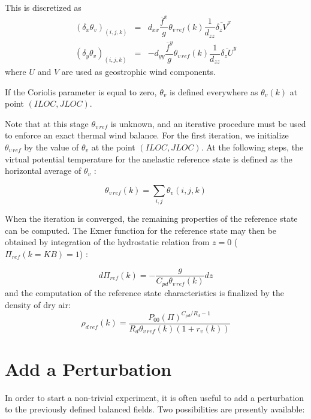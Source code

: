 This is discretized as
\begin{eqnarray}
\left( \delta _{x} \theta_{v}\right)_{(i,j,k)} & = & d_{xx}
 \dfrac{\overline{f}^x}{g}
\theta_{v\,ref}(k) \dfrac{1}{d_{zz}} \overline{\delta_{z} V}^x  \\
\left( \delta _{y} \theta_{v}\right)_{(i,j,k)} & = & - d_{yy}
 \dfrac{\overline{f}^y}{g}
\theta_{v\,ref}(k) \dfrac{1}{d_{zz}} \overline{\delta_{z} U }^y
\end{eqnarray}
where $U$ and $V$ are used as geostrophic wind components.

If the Coriolis parameter is equal to zero, $\theta_{v}$ is defined everywhere
as $\theta_{v}(k)$ at point $(ILOC,JLOC)$.

Note that at this stage $\theta_{v\,ref}$ is unknown, and an iterative
procedure must be used to enforce an exact
 thermal wind balance. For the first iteration, we initialize
$\theta_{v\,ref}$ by the value of $\theta_{v}$ at the point
$(ILOC,JLOC)$. At the following steps,
the virtual potential temperature for the anelastic reference state
is defined as the horizontal average of $\theta_{v}$ :

$$
\theta_{v\,ref}(k) = \sum _{i,j} \theta_{v}(i,j,k)
$$

When the iteration is converged,
the remaining properties of the reference state can be computed.
The Exner function for the
reference state may then be obtained by integration of the hydrostatic relation
from $z=0$ ($\Pi_{ref} (k=KB) =1$) :

$$
d \Pi_{ref}(k) = - \dfrac{g}{C_{pd} \theta_{v\,ref}(k)}  dz
$$
and the computation of the reference state characteristics is finalized
by the density of dry air:
$$
\rho_{d\,ref}(k) = \dfrac{P_{00} (\Pi)^{C_{pd}/R_d - 1} }{R_{d}
\theta_{v\,ref}(k) \left(1+r_{v}(k) \right) }
$$
\section{Add a Perturbation}

In order to start a non-trivial experiment, it is often useful to add
a perturbation to the previously defined balanced fields. Two possibilities
are presently available:

